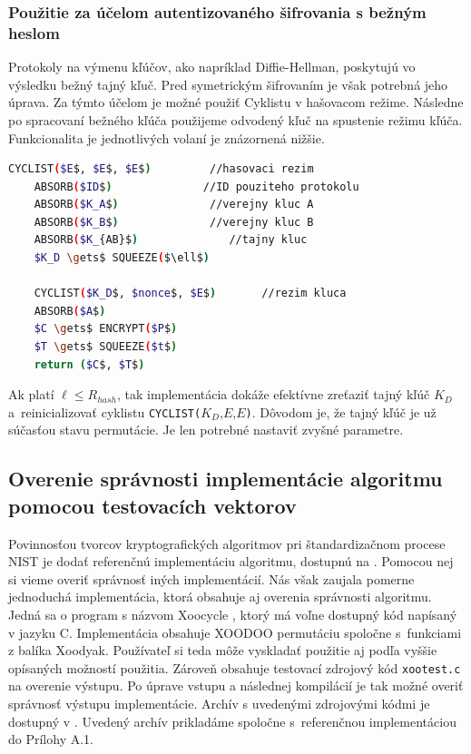 \subsubsection{Použitie za účelom autentizovaného šifrovania s bežným heslom}
Protokoly na výmenu kľúčov, ako napríklad Diffie-Hellman, poskytujú vo výsledku bežný tajný kľuč. Pred symetrickým šifrovaním je však potrebná jeho úprava. Za týmto účelom je možné použiť Cyklistu v hašovacom režime. Následne po spracovaní bežného kľúča použijeme odvodený kľuč na spustenie režimu kľúča. Funkcionalita je jednotlivých volaní je znázornená nižšie. \newpage
\begin{lstlisting}[language=bash,mathescape=true]
	CYCLIST($E$, $E$, $E$)         //hasovaci rezim
	ABSORB($ID$)              //ID pouziteho protokolu
	ABSORB($K_A$)              //verejny kluc A
	ABSORB($K_B$)              //verejny kluc B 
	ABSORB($K_{AB}$)              //tajny kluc 
	$K_D \gets$ SQUEEZE($\ell$)
	
	CYCLIST($K_D$, $nonce$, $E$)       //rezim kluca
	ABSORB($A$)
	$C \gets$ ENCRYPT($P$)
	$T \gets$ SQUEEZE($t$)
	return ($C$, $T$)
\end{lstlisting} 
Ak platí $\ell \leq R_{hash}$, tak implementácia dokáže efektívne zreťaziť tajný kľúč $K_D$ a~reinicializovať cyklistu \lstinline|CYCLIST(|$K_D$,$E$,$E$\lstinline|)|. Dôvodom je, že tajný kľúč je už súčasťou stavu permutácie. Je len potrebné nastaviť zvyšné parametre. 

\subsection{Overenie správnosti implementácie algoritmu pomocou testovacích vektorov}
Povinnosťou tvorcov kryptografických algoritmov pri štandardizačnom procese NIST je dodať referenčnú implementáciu algoritmu, dostupnú na \cite{vektory}. Pomocou nej si vieme overiť správnosť iných implementácií. Nás však zaujala pomerne jednoduchá implementácia, ktorá obsahuje aj overenia správnosti algoritmu. Jedná sa o program s názvom Xoocycle \cite{xootest}, ktorý má voľne dostupný kód napísaný v jazyku C. Implementácia obsahuje XOODOO permutáciu spoločne s~funkciami z balíka Xoodyak. Používateľ si teda môže vyskladať použitie aj podľa vyššie opísaných možností použitia. Zároveň obsahuje testovací zdrojový kód \lstinline|xootest.c| na overenie výstupu. Po úprave vstupu a následnej kompilácií je tak možné overiť správnosť výstupu implementácie. Archív s uvedenými zdrojovými kódmi je dostupný v \cite{xootest}. Uvedený archív prikladáme spoločne s~referenčnou implementáciou do Prílohy A.1.       